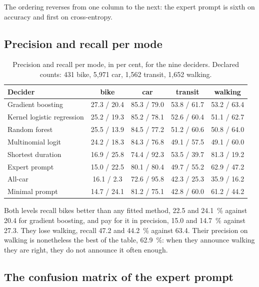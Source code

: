 The ordering reverses from one column to the next: the expert prompt is sixth on accuracy and first on cross-entropy.

\subsection{Precision and recall per mode}

\begin{table}[tp]
  \caption{Precision and recall per mode, in per cent, for the nine deciders. Declared counts: 431 bike, 5{,}971 car, 1{,}562 transit, 1{,}652 walking.}
  \label{tab:unit-modes}
  \begin{tabular}{lcccc}
    \toprule
    Decider & bike & car & transit & walking \\
    \midrule
    Gradient boosting          & 27.3 / 20.4 & 85.3 / 79.0 & 53.8 / 61.7 & 53.2 / 63.4 \\
    Kernel logistic regression & 25.2 / 19.3 & 85.2 / 78.1 & 52.6 / 60.4 & 51.1 / 62.7 \\
    Random forest              & 25.5 / 13.9 & 84.5 / 77.2 & 51.2 / 60.6 & 50.8 / 64.0 \\
    Multinomial logit          & 24.2 / 18.3 & 84.3 / 76.8 & 49.1 / 57.5 & 49.1 / 60.0 \\
    Shortest duration          & 16.9 / 25.8 & 74.4 / 92.3 & 53.5 / 39.7 & 81.3 / 19.2 \\
    Expert prompt              & 15.0 / 22.5 & 80.1 / 80.4 & 49.7 / 55.2 & 62.9 / 47.2 \\
    All-car                    & 16.1 / \phantom{0}2.3 & 72.6 / 95.8 & 42.3 / 25.3 & 35.9 / 16.2 \\
    Minimal prompt             & 14.7 / 24.1 & 81.2 / 75.1 & 42.8 / 60.0 & 61.2 / 44.2 \\
    \bottomrule
  \end{tabular}
\end{table}

Both levels recall bikes better than any fitted method, 22.5 and 24.1~\% against 20.4 for gradient boosting, and pay for it in precision, 15.0 and 14.7~\% against 27.3. They lose walking, recall 47.2 and 44.2~\% against 63.4. Their precision on walking is nonetheless the best of the table, 62.9~\%: when they announce walking they are right, they do not announce it often enough.

\subsection{The confusion matrix of the expert prompt}

